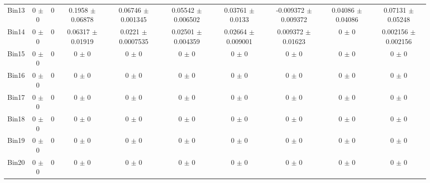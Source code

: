 \begin{tabular}{@{\extracolsep{4pt}}lccccccccc@{}}
     Bin13 & 0 $\pm$ 0 & 0 & 0.1958 $\pm$ 0.06878 & 0.06746 $\pm$ 0.001345 & 0.05542 $\pm$ 0.006502 & 0.03761 $\pm$ 0.0133 & -0.009372 $\pm$ 0.009372 & 0.04086 $\pm$ 0.04086 & 0.07131 $\pm$ 0.05248 \\ 
     Bin14 & 0 $\pm$ 0 & 0 & 0.06317 $\pm$ 0.01919 & 0.0221 $\pm$ 0.0007535 & 0.02501 $\pm$ 0.004359 & 0.02664 $\pm$ 0.009001 & 0.009372 $\pm$ 0.01623 & 0 $\pm$ 0 & 0.002156 $\pm$ 0.002156 \\ 
     Bin15 & 0 $\pm$ 0 & 0 & 0 $\pm$ 0 & 0 $\pm$ 0 & 0 $\pm$ 0 & 0 $\pm$ 0 & 0 $\pm$ 0 & 0 $\pm$ 0 & 0 $\pm$ 0 \\ 
     Bin16 & 0 $\pm$ 0 & 0 & 0 $\pm$ 0 & 0 $\pm$ 0 & 0 $\pm$ 0 & 0 $\pm$ 0 & 0 $\pm$ 0 & 0 $\pm$ 0 & 0 $\pm$ 0 \\ 
     Bin17 & 0 $\pm$ 0 & 0 & 0 $\pm$ 0 & 0 $\pm$ 0 & 0 $\pm$ 0 & 0 $\pm$ 0 & 0 $\pm$ 0 & 0 $\pm$ 0 & 0 $\pm$ 0 \\ 
     Bin18 & 0 $\pm$ 0 & 0 & 0 $\pm$ 0 & 0 $\pm$ 0 & 0 $\pm$ 0 & 0 $\pm$ 0 & 0 $\pm$ 0 & 0 $\pm$ 0 & 0 $\pm$ 0 \\ 
     Bin19 & 0 $\pm$ 0 & 0 & 0 $\pm$ 0 & 0 $\pm$ 0 & 0 $\pm$ 0 & 0 $\pm$ 0 & 0 $\pm$ 0 & 0 $\pm$ 0 & 0 $\pm$ 0 \\ 
     Bin20 & 0 $\pm$ 0 & 0 & 0 $\pm$ 0 & 0 $\pm$ 0 & 0 $\pm$ 0 & 0 $\pm$ 0 & 0 $\pm$ 0 & 0 $\pm$ 0 & 0 $\pm$ 0 \\ 
\hline\hline
  \end{tabular}
